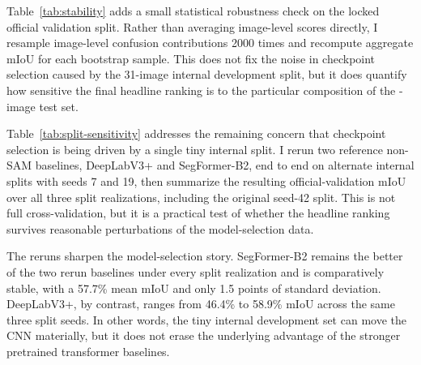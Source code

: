 \documentclass{article}
\begin{document}
Table~\ref{tab:stability} adds a small statistical robustness check on the locked official validation split. Rather than averaging image-level scores directly, I resample image-level confusion contributions \num{2000} times and recompute aggregate mIoU for each bootstrap sample. This does not fix the noise in checkpoint selection caused by the 31-image internal development split, but it does quantify how sensitive the final headline ranking is to the particular composition of the \OfficialValCount{}-image test set.

\begin{table}[H]
  \centering
  \caption{Bootstrap stability analysis for the headline models on the locked official validation split. The interval is the percentile 95\% confidence interval of aggregate mIoU under image-level bootstrap resampling.}
  \label{tab:stability}
  
\end{table}

Table~\ref{tab:split-sensitivity} addresses the remaining concern that checkpoint selection is being driven by a single tiny internal split. I rerun two reference non-SAM baselines, DeepLabV3+ and SegFormer-B2, end to end on alternate internal splits with seeds 7 and 19, then summarize the resulting official-validation mIoU over all three split realizations, including the original seed-42 split. This is not full cross-validation, but it is a practical test of whether the headline ranking survives reasonable perturbations of the model-selection data.

\begin{table}[H]
  \centering
  \caption{Alternate-split sensitivity for DeepLabV3+ and SegFormer-B2. Each row summarizes official-validation mIoU over the original internal split (seed 42) plus two alternate label-aware splits (seeds 7 and 19).}
  \label{tab:split-sensitivity}
  
\end{table}

The reruns sharpen the model-selection story. SegFormer-B2 remains the better of the two rerun baselines under every split realization and is comparatively stable, with a \num{57.7}\% mean mIoU and only \num{1.5} points of standard deviation. DeepLabV3+, by contrast, ranges from \num{46.4}\% to \num{58.9}\% mIoU across the same three split seeds. In other words, the tiny internal development set can move the CNN materially, but it does not erase the underlying advantage of the stronger pretrained transformer baselines.
\end{document}
